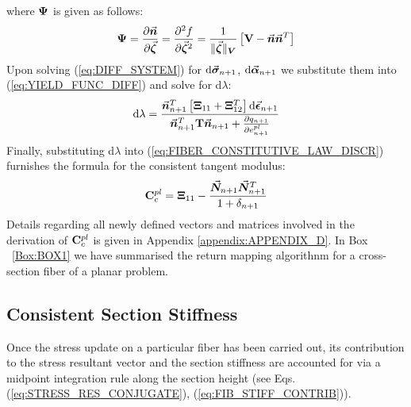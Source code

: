 \noindent where $\mathbf{\Psi}$ is given as follows:
\begin{equation}
	\mathbf{\Psi} = \frac{\partial\vec{\bm{n}}}{\partial \vec{\bm{\zeta}}}=
	\frac{\partial^2 f}{\partial \vec{\bm{\zeta}}^2} = \frac{1}{\Vert
		\vec{\bm{\zeta}}\Vert_{\bm{V}}}\left[ \mathbf{V}-\vec{\bm{n}}\vec{\bm{n}}^T\right]
	\label{eq:B}
\end{equation}
Upon solving (\ref{eq:DIFF_SYSTEM}) for $\text{d}\vec{\bm{\sigma}}_{n+1}$,
$\text{d}\vec{\bm{\alpha}}_{n+1}$ we substitute them into (\ref{eq:YIELD_FUNC_DIFF})
and solve for d$\lambda$:
\begin{equation}
	\text{d}\lambda =
	\frac{\vec{\bm{n}}_{n+1}^T\left[\mathbf{\Xi}_{11}+\mathbf{\Xi}_{12}^T\right]\text{d}\vec{\bm{\epsilon}}_{n+1}}{\vec{\bm{n}}_{n+1}^T\mathbf{T}\vec{\bm{n}}_{n+1}+
		\frac{\partial q_{n+1}}{\partial e_{n+1}^{pl}}}
	\label{eq:DE_GAMMA}
\end{equation}
Finally, substituting d$\lambda$ into (\ref{eq:FIBER_CONSTITUTIVE_LAW_DISCR}) 
furnishes the formula for the consistent tangent modulus:
\begin{equation}
	\mathbf{C}_c^{pl} = 
	\mathbf{\Xi}_{11}-\frac{\vec{\bm{N}}_{n+1}\vec{\bm{N}}_{n+1}^T}{1+\delta_{n+1}}
	\label{eq:CONSISTENT TANGENT MOD}
\end{equation}
Details regarding all newly defined vectors and matrices involved in the
derivation of $\mathbf{C}_c^{pl}$ is given in Appendix \ref{appendix:APPENDIX_D}. 
In Box ~\ref{Box:BOX1} 
we have summarised the return mapping algorithnm for a cross-section fiber of a 
planar problem.

\subsection{Consistent Section Stiffness}\label{section:CH3-S4SS3}

Once the stress update on a particular fiber has been carried out, its
contribution to the stress resultant vector and the section stiffness are
accounted for via a midpoint integration rule along the section height (see Eqs.
(\ref{eq:STRESS_RES_CONJUGATE}), (\ref{eq:FIB_STIFF_CONTRIB})).

